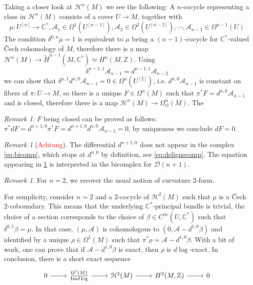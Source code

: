 \documentclass[a4paper]{book}
\newcommand{\lA}{\mathcal{A}}
\newcommand{\bC}{\mathbb{C}}
\newcommand{\lD}{\mathcal{D}}
\newcommand{\lH}{\mathcal{H}}
\newcommand{\bZ}{\mathbb{Z}}
\newcommand{\cl}{\mathrm{cl}}
\newcommand{\nrnote}[1]{\todo[color=green!40,linecolor=green!40!black,size=\tiny]{#1}}
\theoremstyle{definition}
\theoremstyle{remark}
\newtheorem{remark}[equation]{Remark}
\numberwithin{equation}{section}
\begin{document}
Taking a closer look at $\lH^n(M)$ we see the following: A $n$-cocycle representing a class in $\lH^n(M)$ consists of a cover $U\to M$, together with \[\mu:U^{[n]}\to\bC^*,\lA_1\in\Omega^1(U^{[n-1]}),\lA_2\in\Omega^2(U^{[n-2]}),\cdots,\lA_{n-1}\in\Omega^{n-1}(U)\]
The condition $\delta^{0,n}\mu=1$ is equivalent to $\mu$ being a $(n-1)$-cocycle for $\bC^*$-valued \v Cech cohomology of $M$, therefore there is a map $\lH^n(M)\to\check{H}^{n-1}(M,\bC^*)\simeq H^n(M,\bZ)$. Using \[\delta^{n-1,1}\lA_{n-1}= d^{n-1,1}\lA_{n-2}\]we can show that $\delta^{n,1} d^{n,0}\lA_{n-1}=0\in\Omega^n(U^{[2]})$, i.e. $ d^{n,0}\lA_{n-1}$ is constant on fibers of $\pi:U\to M$, so there is a unique $F\in\Omega^{n}(M)$ such that $\pi^*F= d^{n,0}\lA_{n-1}$ and is closed, therefore there is a map $\lH^n(M)\to\Omega^{n}_{\cl}(M)$.\nrnote{How to prove $F$ has integral periods?} The 
\begin{remark}\label{rmk:close}
	$F$ being closed can be proved as follows: $\pi^* d F= d^{n+1,0}\pi^*F= d^{n+1,0} d^{n,0}\lA_{n-1}=0$, by uniqueness we conclude $dF=0$. 
\end{remark}
\begin{remark}[\textcolor{red}{Achtung}] The differential $d^{n+1,0}$ does not appear in the complex \cref{eq:bicomp}, which stops at $d^{n,0}$ by definition, see \cref{eq:delignecomp}. The equation appearing in \cref{rmk:close} is interpreted in the bicomplex for $\lD(n+1)$. 
\end{remark}
\begin{remark}
	For $n=2$, we recover the usual notion of curvature 2-form. 
\end{remark}
For semplicity, consider $n=2$ and a $2$-cocycle of $\lH^2(M)$ such that $\mu$ is a \v Cech $2$-coboundary. This means that the underlying $\bC^*$-principal bundle is trivial, the choice of a section corresponds to the choice of $\beta\in C^\infty(U,\bC^*)$ such that $\delta^{0,1}\beta=\mu$. In that case, $(\mu,\lA)$ is cohomologous to $(0,\lA-d^{1,0}\beta)$ and identified by a unique $\rho\in\Omega^1(M)$ such that $\pi^*\rho=\lA-d^{1,0}\beta$. With a bit of work, one can prove that if $\lA-d^{1,0}\beta$ is exact, then $\rho$ is $d\log$-exact. In conclusion, there is a short exact sequence \begin{equation}
	\begin{tikzcd}
		0 \arrow[r] & \frac{\Omega^1(M)}{\mathrm{Im}d\log} \arrow[r] & \lH^2(M) \arrow[r] & H^2(M,\bZ) \arrow[r] & 0
	\end{tikzcd}
\end{equation}
\end{document}
